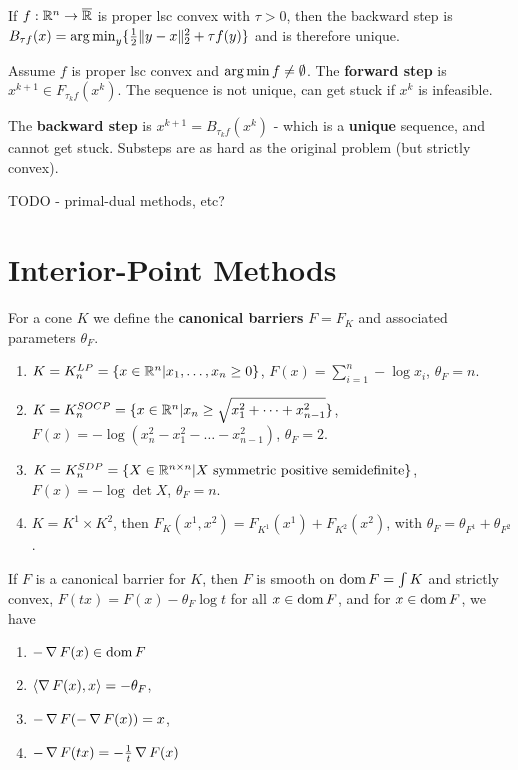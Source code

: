 \begin{thm}
  \label{sec:first-order-methods-2}
  If $f: \mathbb{R}^{n} \rightarrow \overline {\mathbb{R}}$ is proper lsc convex with
  $\tau > 0$, then the backward step is $B_{\tau f}(x) = \operatorname*{arg\,min}_{y}
  \{ \frac{1}{2} \| y - x \|_{2}^{2} + \tau f(y) \} $ and is therefore unique.
\end{thm}

\begin{thm}
  \label{sec:first-order-methods-3}
  Assume $f$ is proper lsc convex and $\operatorname*{arg\,min} f \neq \emptyset$. The
  \textbf{forward step} is $x^{k+1} \in F_{\tau_{k} f}(x^{k})$. The
  sequence is not unique, can get stuck if $x^{k}$ is infeasible.

  The \textbf{backward step} is $x^{k+1} = B_{\tau_{k} f}(x^{k})$ -
  which is a \textbf{unique} sequence, and cannot get stuck.  Substeps
  are as hard as the original problem (but strictly convex).
\end{thm}

TODO - primal-dual methods, etc?

\section{Interior-Point Methods}
\label{sec:inter-point-meth}

\begin{defn}
  \label{sec:inter-point-meth-1}
  For a cone $K$ we define the \textbf{canonical barriers} $F = F_{K}$
  and associated parameters $\theta_{F}$.
  \begin{enumerate}
  \item $K = K^{LP}_{n} = \{ x \in \mathbb{R}^{n} | x_{1}, \dots, x_{n} \geq 0
    \} $, $F(x) = \sum_{i=1}^{n} -\log x_{i}$, $\theta_{F} = n$.
  \item $K = K_{n}^{SOCP} = \{ x \in \mathbb{R}^{n} | x_{n} \geq
    \sqrt{x_{1}^{2} + \cdots + x_{n-1}^{2}}\}$, $F(x) =
    -\log(x_{n}^{2} - x_{1}^{2} - \dots - x_{n-1}^{2})$, $\theta_{F} =
    2$.
  \item $K = K_{n}^{SDP} = \{ X \in \mathbb{R}^{n \times n} | \text{$X$
      symmetric positive semidefinite} \}$, $F(x) = - \log \det X$,
    $\theta_{F} = n$.
  \item $K = K^{1} \times K^{2}$, then $F_{K}(x^{1}, x^{2}) =
    F_{K^{1}}(x^{1}) + F_{K^{2}}(x^{2})$, with $\theta_{F} =
    \theta_{F^{1}} + \theta_{F^{2}}$.
  \end{enumerate}
\end{defn}

\begin{thm}
  \label{sec:inter-point-meth-2}
  If $F$ is a canonical barrier for $K$, then $F$ is smooth on $\operatorname*{dom} F
  = \int K$ and strictly convex, $F(tx) = F(x) - \theta_{F} \log t$
  for all  $x \in \operatorname*{dom} F$, and for $x \in \operatorname*{dom} F$, we have
  \begin{enumerate}
  \item $- \operatorname*{\nabla} F(x) \in \operatorname*{dom} F$
  \item $\IP{\grad F(x), x} = - \theta_{F}$,
  \item $-\operatorname*{\nabla} F(-\operatorname*{\nabla} F(x)) = x$,
  \item $-\operatorname*{\nabla} F(tx) = -\frac{1}{t} \operatorname*{\nabla} F(x)$
  \end{enumerate}
\end{thm}

